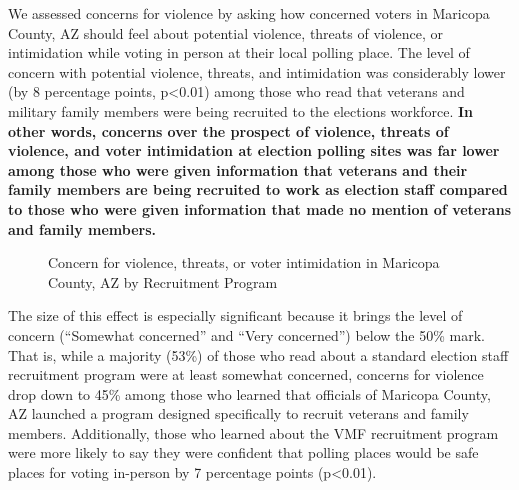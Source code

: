 \documentclass[
  11pt,
  a4paper,
]{article}
\begin{document}
We assessed concerns for violence by asking how concerned voters in
Maricopa County, AZ should feel about potential violence, threats of
violence, or intimidation while voting in person at their local polling
place. The level of concern with potential violence, threats, and
intimidation was considerably lower (by 8 percentage points,
p\textless0.01) among those who read that veterans and military family
members were being recruited to the elections workforce. \textbf{In
other words, concerns over the prospect of violence, threats of
violence, and voter intimidation at election polling sites was far lower
among those who were given information that veterans and their family
members are being recruited to work as election staff compared to those
who were given information that made no mention of veterans and family
members.}

\begin{figure}

\caption{\label{fig-q25-likert}Concern for violence, threats, or voter
intimidation in Maricopa County, AZ by Recruitment Program}


\end{figure}%

The size of this effect is especially significant because it brings the
level of concern (``Somewhat concerned'' and ``Very concerned'') below
the 50\% mark. That is, while a majority (53\%) of those who read about
a standard election staff recruitment program were at least somewhat
concerned, concerns for violence drop down to 45\% among those who
learned that officials of Maricopa County, AZ launched a program
designed specifically to recruit veterans and family members.
Additionally, those who learned about the VMF recruitment program were
more likely to say they were confident that polling places would be safe
places for voting in-person by 7 percentage points (p\textless0.01).
\end{document}
